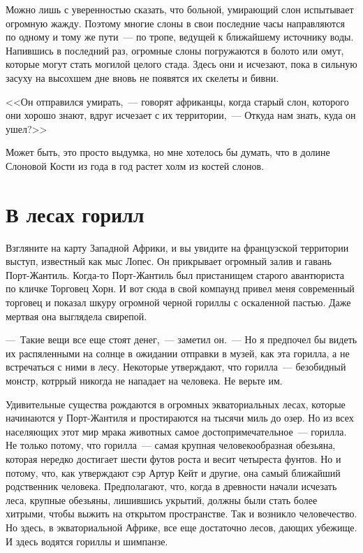 \documentclass[12pt,a4paper,twoside,openany,svgnames]{memoir}
\begin{document}
Можно лишь с уверенностью сказать, что больной, умирающий слон испытывает огромную жажду. Поэтому многие слоны в свои последние часы направляются по одному и тому же пути~--- по тропе, ведущей к ближайшему источнику воды. Напившись в последний раз, огромные слоны погружаются в болото или омут, которые могут стать могилой целого стада. Здесь они и исчезают, пока в сильную засуху на высохшем дне вновь не появятся их скелеты и бивни.

<<Он отправился умирать,~--- говорят африканцы, когда старый слон, которого они хорошо знают, вдруг исчезает с их территории,~--- Откуда нам знать, куда он ушел?>>

Может быть, это просто выдумка, но мне хотелось бы думать, что в долине Слоновой Кости из года в год растет холм из костей слонов.

\chapter{В лесах горилл}

Взгляните на карту Западной Африки, и вы увидите на французской территории выступ, известный как мыс Лопес. Он прикрывает огромный залив и гавань Порт-Жантиль. Когда-то Порт-Жантиль был пристанищем старого авантюриста по кличке Торговец Хорн. И вот сюда в свой компаунд привел меня современный торговец и показал шкуру огромной черной гориллы с оскаленной пастью. Даже мертвая она выглядела свирепой.

---~Такие вещи все еще стоят денег,~--- заметил он.~--- Но я предпочел бы видеть их распяленными на солнце в ожидании отправки в музей, как эта горилла, а не встречаться с ними в лесу. Некоторые утверждают, что горилла~--- безобидный монстр, котррый никогда не нападает на человека. Не верьте им.

Удивительные существа рождаются в огромных экваториальных лесах, которые начинаются у Порт-Жантиля и простираются на тысячи миль до озер. Но из всех населяющих этот мир мрака животных самое достопримечательное~--- горилла. Не только потому, что горилла~--- самая крупная человекообразная обезьяна, которая нередко достигает шести футов роста и весит четыреста фунтов. Но и потому, что, как утверждают сэр Артур Кейт и другие, она самый ближайший родственник человека. Предполагают, что, когда в древности начали исчезать леса, крупные обезьяны, лишившись укрытий, должны были стать более хитрыми, чтобы выжить на открытом пространстве. Так и возникло человечество. Но здесь, в экваториальной Африке, все еще достаточно лесов, дающих убежище. И здесь водятся гориллы и шимпанзе.
\end{document}
